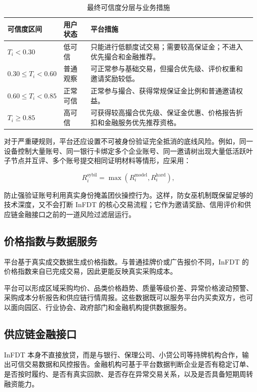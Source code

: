 \documentclass[UTF8,11pt]{ctexart}
\begin{document}
\begin{table}[h]
    \centering
    \caption{最终可信度分层与业务措施}
    \begin{tabularx}{\textwidth}{p{2.7cm}p{3cm}Y}
        \toprule
        可信度区间               & 用户状态 & 平台措施                                \\
        \midrule
        $T_i<0.30$          & 低可信  & 只能进行低额度试交易；需要较高保证金；不进入优先撮合和金融推荐。    \\
        $0.30\leq T_i<0.60$ & 普通观察 & 可正常参与基础交易，但撮合优先级、评价权重和邀请奖励较低。       \\
        $0.60\leq T_i<0.85$ & 正常可信 & 正常参与撮合、获得常规保证金比例和普通邀请权益。            \\
        $T_i\geq0.85$       & 高可信  & 可获得较高撮合优先级、保证金优惠、价格报告折扣和金融服务优先推荐资格。 \\
        \bottomrule
    \end{tabularx}
\end{table}

对于严重硬规则，平台还应设置不可被身份验证完全抵消的底线风险。例如，同一设备控制大量账号、同一银行卡绑定多个企业账号、同一邀请树出现大量低活跃叶子节点并互评、多个账号提交相同证明材料等情形，应采用：

\[
    R_i^{\mathrm{sybil}}=\max\left(R_i^{\mathrm{model}},R_i^{\mathrm{hard}}\right),
\]

防止强验证账号利用真实身份掩盖团伙操控行为。这样，防女巫机制既保留足够的技术深度，又不会打断 InFDT 的核心交易流程；它作为邀请奖励、信用评价和供应链金融接口之前的一道风险过滤层运行。

\subsection{价格指数与数据服务}

平台基于真实成交数据生成价格指数。与普通挂牌价或广告报价不同，InFDT 的价格指数来自已完成交易，因此更能反映真实采购成本。

平台可以形成区域采购均价、品类价格趋势、质量等级价差、异常价格波动预警、采购成本分析报告和供应链行情周报。这些数据既可以服务平台内买卖双方，也可以面向园区、行业协会、政府部门和金融机构提供数据服务。

\subsection{供应链金融接口}

InFDT 本身不直接放贷，而是与银行、保理公司、小贷公司等持牌机构合作，输出可信交易数据和风控报告。金融机构可基于平台数据判断企业是否有稳定订单、是否按时履约、是否有真实回款、是否存在异常交易关系，以及是否具备短期周转融资能力。
\end{document}
